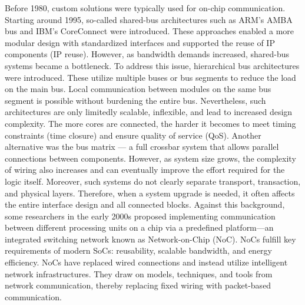 Before 1980, custom solutions were typically used for on-chip communication. Starting around 1995, so-called shared-bus architectures such as ARM’s AMBA bus and IBM’s CoreConnect were introduced. These approaches enabled a more modular design with standardized interfaces and supported the reuse of IP components (IP reuse).
However, as bandwidth demands increased, shared-bus systems became a bottleneck. To address this issue, hierarchical bus architectures were introduced. These utilize multiple buses or bus segments to reduce the load on the main bus. Local communication between modules on the same bus segment is possible without burdening the entire bus. Nevertheless, such architectures are only limitedly scalable, inflexible, and lead to increased design complexity. The more cores are connected, the harder it becomes to meet timing constraints (time closure) and ensure quality of service (QoS).
Another alternative was the bus matrix — a full crossbar system that allows parallel connections between components. However, as system size grows, the complexity of wiring also increases and can eventually improve the effort required for the logic itself. Moreover, such systems do not clearly separate transport, transaction, and physical layers. Therefore, when a system upgrade is needed, it often affects the entire interface design and all connected blocks.
Against this background, some researchers in the early 2000s proposed implementing communication between different processing units on a chip via a predefined platform—an integrated switching network known as Network-on-Chip (NoC). NoCs fulfill key requirements of modern SoCs: reusability, scalable bandwidth, and energy efficiency. NoCs have replaced wired connections and instead utilize intelligent network infrastructures. They draw on models, techniques, and tools from network communication, thereby replacing fixed wiring with packet-based communication.

